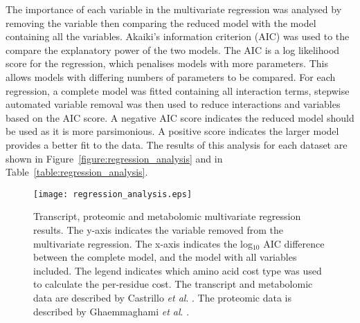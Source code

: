 The importance of each variable in the multivariate regression was analysed by removing the variable then comparing the reduced model with the model containing all the variables. Akaiki's information criterion (AIC) \cite{akaike1974} was used to the compare the explanatory power of the two models. The AIC is a log likelihood score for the regression, which penalises models with more parameters. This allows models with differing numbers of parameters to be compared. For each regression, a complete model was fitted containing all interaction terms, stepwise automated variable removal was then used to reduce interactions and variables based on the AIC score. A negative AIC score indicates the reduced model should be used as it is more parsimonious. A positive score indicates the larger model provides a better fit to the data. The results of this analysis for each dataset are shown in Figure~\vref{figure:regression_analysis} and in Table~\vref{table:regression_analysis}.

\begin{figure}
  \centering
  \texttt{[image: regression\_analysis.eps]}
  \caption[Transcript, proteomic and metabolomic multivariate regression results.]{Transcript, proteomic and metabolomic multivariate regression results. The y-axis indicates the variable removed from the multivariate regression. The x-axis indicates the log$_{10}$ AIC difference between the complete model, and the model with all variables included. The legend indicates which amino acid cost type was used to calculate the per-residue cost. The transcript and metabolomic data are described by Castrillo \emph{et al}. \cite{castrillo2007}. The proteomic data is described by Ghaemmaghami \emph{et al}. \cite{ghaemmaghami2003}.}
  \label{figure:regression_analysis}
\end{figure}

